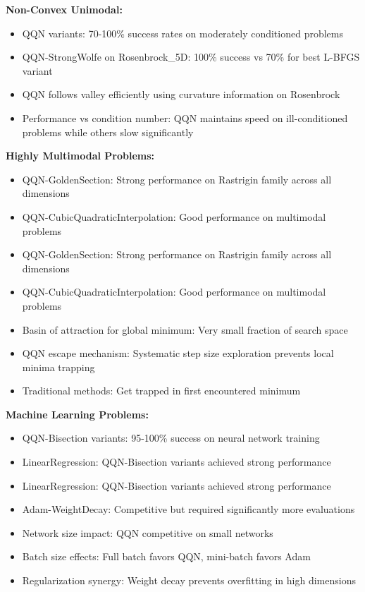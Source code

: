 \textbf{Non-Convex Unimodal:}

\begin{itemize}
\tightlist
\item
  QQN variants: 70-100\% success rates on moderately conditioned problems
\item
  QQN-StrongWolfe on Rosenbrock\_5D: 100\% success vs 70\% for best L-BFGS variant
\item
  QQN follows valley efficiently using curvature information on Rosenbrock
\item
  Performance vs condition number: QQN maintains speed on ill-conditioned problems while others slow significantly
\end{itemize}

\textbf{Highly Multimodal Problems:}

\begin{itemize}
\tightlist
\item
  QQN-GoldenSection: Strong performance on Rastrigin family across all dimensions
\item
  QQN-CubicQuadraticInterpolation: Good performance on multimodal problems
\item
  QQN-GoldenSection: Strong performance on Rastrigin family across all dimensions
\item
  QQN-CubicQuadraticInterpolation: Good performance on multimodal problems
\item
  Basin of attraction for global minimum: Very small fraction of search space
\item
  QQN escape mechanism: Systematic step size exploration prevents local minima trapping
\item
  Traditional methods: Get trapped in first encountered minimum
\end{itemize}

\textbf{Machine Learning Problems:}

\begin{itemize}
\tightlist
\item
  QQN-Bisection variants: 95-100\% success on neural network training
\item
  LinearRegression: QQN-Bisection variants achieved strong performance
\item
  LinearRegression: QQN-Bisection variants achieved strong performance
\item
  Adam-WeightDecay: Competitive but required significantly more evaluations
\item
  Network size impact: QQN competitive on small networks
\item
  Batch size effects: Full batch favors QQN, mini-batch favors Adam
\item
  Regularization synergy: Weight decay prevents overfitting in high dimensions
\end{itemize}


